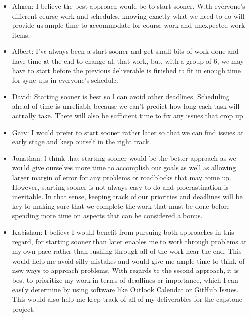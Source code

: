 \documentclass[12pt,letterpaper]{article}
\begin{document}
\begin{itemize}
    \item Almen: I believe the best approach would be to start sooner. With everyone's different course work and schedules, knowing exactly what we need to do will provide us ample time to accommodate for course work and unexpected work items.
    \item Albert: I've always been a start sooner and get small bits of work done and have time at the end to change all that work, but, with a group of 6, we may have to start before the previous deliverable is finished to fit in enough time for sync ups in everyone's schedule.
    \item David: Starting sooner is best so I can avoid other deadlines. Scheduling ahead of time is unreliable because we can't predict how long each task will actually take. There will also be sufficient time to fix any issues that crop up.
    \item Gary: I would prefer to start sooner rather later so that we can find issues at early stage and keep ourself in the right track.
    \item Jonathan: I think that starting sooner would be the better approach as we would give ourselves more time to accomplish our goals as well as allowing larger margin of error for any problems or roadblocks that may come up. However, starting sooner is not always easy to do and procrastination is inevitable. In that sense, keeping track of our priorities and deadlines will be key to making sure that we complete the work that must be done before spending more time on aspects that can be considered a bonus.
    \item Kabishan: I believe I would benefit from pursuing both approaches in this regard, for starting sooner than later enables me to work through problems at my own pace rather than rushing through all of the work near the end. This would help me avoid silly mistakes and would give me ample time to think of new ways to approach problems. With regards to the second approach, it is best to prioritize my work in terms of deadlines or importance, which I can easily determine by using software like Outlook Calendar or GitHub Issues. This would also help me keep track of all of my deliverables for the capstone project.
\end{itemize}
\end{document}
